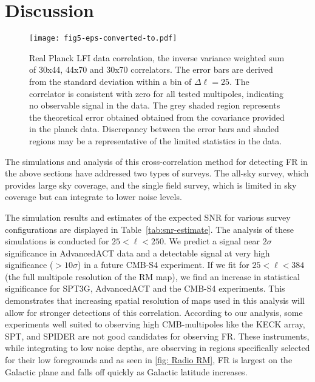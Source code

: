 \documentclass[usenatbib,hidelinks]{mnras}
\begin{document}
\section{Discussion}\label{sec:summary}{


\begin{figure}
\centering
\texttt{[image: fig5-eps-converted-to.pdf]}

\caption{Real Planck LFI data correlation, the inverse variance weighted sum of 30x44, 44x70 and 30x70 correlators.
The error bars are derived from the standard deviation within a bin of $\Delta \ell=25$. The correlator is consistent with zero for all tested multipoles, indicating no observable signal in the data. The grey shaded region represents the theoretical error obtained obtained from the covariance provided in the planck data. Discrepancy between the error bars and shaded regions may be a representative of the limited statistics in the data.\label{fig:planck-data}}
\end{figure}  

The simulations and analysis of this cross-correlation method for detecting FR in the above sections have addressed two types of surveys. The all-sky survey, which provides large sky coverage, and the single field survey, which is limited in sky coverage but can integrate to lower noise levels.


 The simulation results and estimates of the expected SNR for various survey configurations are displayed in Table~\ref{tab:snr-estimate}.
The analysis of these simulations is conducted for $25 < \ell< 250$.
We predict a signal near $2\sigma$ significance in AdvancedACT data and a detectable signal at very high significance ($> 10\sigma$) in a future CMB-S4 experiment. 
If we fit for $25<\ell<384$ (the full multipole resolution of the RM map), we find an increase in statistical significance for SPT3G, AdvancedACT and the CMB-S4 experiments. This demonstrates that 
increasing spatial resolution of maps used in this analysis will
allow for stronger detections of this correlation.
According to our analysis, some experiments well suited to observing high CMB-multipoles like the KECK array, SPT, and SPIDER are not good candidates for observing FR. These instruments, while integrating to low noise depths, are observing in regions specifically selected for their low foregrounds and as seen in \autoref{fig: Radio RM}, FR is largest on the Galactic plane and falls off quickly as Galactic latitude increases.

}
\end{document}
